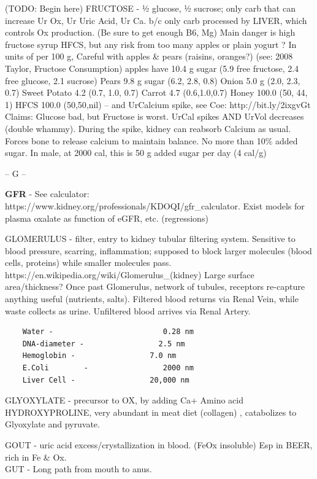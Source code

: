 (TODO: Begin here) FRUCTOSE - ½ glucose, ½ sucrose; only carb that can
increase Ur Ox, Ur Uric Acid, Ur Ca. b/c only carb processed by LIVER,
which controls Ox production. (Be sure to get enough B6, Mg) Main danger
is high fructose syrup HFCS, but any risk from too many apples or plain
yogurt ? In units of per 100 g, Careful with apples \& pears (raisins,
oranges?) (see: 2008 Taylor, Fructose Consumption) apples have 10.4 g
sugar (5.9 free fructose, 2.4 free glucose, 2.1 sucrose) Pears 9.8 g
sugar (6.2, 2.8, 0.8) Onion 5.0 g (2.0, 2.3, 0.7) Sweet Potato 4.2 (0.7,
1.0, 0.7) Carrot 4.7 (0.6,1.0,0.7) Honey 100.0 (50, 44, 1) HFCS 100.0
(50,50,nil) -- and UrCalcium spike, see Coe: http://bit.ly/2ixgvGt
Claims: Glucose bad, but Fructose is worst. UrCal spikes AND UrVol
decreases (double whammy). During the spike, kidney can reabsorb Calcium
as usual. Forces bone to release calcium to maintain balance. No more
than 10\% added sugar. In male, at 2000 cal, this is 50 g added sugar
per day (4 cal/g)

-- G --

\textbf{GFR} - See calculator:
https://www.kidney.org/professionals/KDOQI/gfr\_calculator. Exist models
for plasma oxalate as function of eGFR, etc. (regressions)

GLOMERULUS - filter, entry to kidney tubular filtering system. Sensitive
to blood pressure, scarring, inflammation; supposed to block larger
molecules (blood cells, proteins) while smaller molecules pass.
https://en.wikipedia.org/wiki/Glomerulus\_(kidney) Large surface
area/thickness? Once past Glomerulus, network of tubules, receptors
re-capture anything useful (nutrients, salts). Filtered blood returns
via Renal Vein, while waste collects as urine. Unfiltered blood arrives
via Renal Artery.

\begin{verbatim}
    Water -                         0.28 nm
    DNA-diameter -                 2.5 nm
    Hemoglobin -                 7.0 nm
    E.Coli        -                 2000 nm
    Liver Cell -                 20,000 nm
\end{verbatim}

GLYOXYLATE - precursor to OX, by adding Ca+ Amino acid HYDROXYPROLINE,
very abundant in meat diet (collagen) , catabolizes to Glyoxylate and
pyruvate.

GOUT - uric acid excess/crystallization in blood. (FeOx insoluble) Esp
in BEER, rich in Fe \& Ox.\\
GUT - Long path from mouth to anus.

